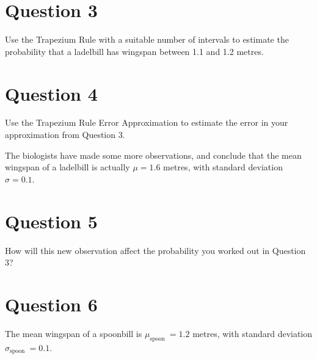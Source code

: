 \documentclass[12pt]{article}
\begin{document}

\section*{Question 3}
Use the Trapezium Rule with a suitable number of intervals to estimate the probability that a ladelbill has wingspan between 1.1 and 1.2 metres.

\section*{Question 4}
Use the Trapezium Rule Error Approximation to estimate the error in your approximation from Question 3.

The biologists have made some more observations, and conclude that the mean wingspan of a ladelbill is actually $\mu=1.6$ metres, with standard deviation $\sigma=0.1$.

\section*{Question 5}
How will this new observation affect the probability you worked out in Question 3?

\section*{Question 6}
The mean wingspan of a spoonbill is $\mu_{\text {spoon }}=1.2$ metres, with standard deviation $\sigma_{\text {spoon }}=0.1$.
\end{document}
